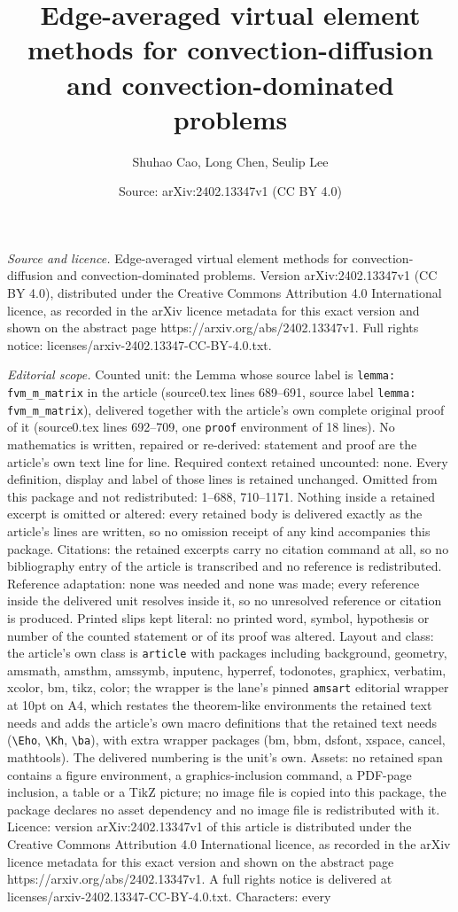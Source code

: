 \documentclass[10pt,a4paper]{amsart}
\title[Edge-averaged virtual element methods for convection-diffusi]{Edge-averaged virtual element methods for convection-diffusion and convection-dominated problems}
\author{Shuhao Cao, Long Chen, Seulip Lee}
\date{Source: arXiv:2402.13347v1 (CC BY 4.0)}
\begin{document}
\maketitle

\noindent\emph{Source and licence.} Edge-averaged virtual element methods for convection-diffusion and convection-dominated problems. Version arXiv:2402.13347v1 (CC BY 4.0), distributed under the Creative Commons Attribution 4.0 International licence, as recorded in the arXiv licence metadata for this exact version and shown on the abstract page https://arxiv.org/abs/2402.13347v1. Full rights notice: licenses/arxiv-2402.13347-CC-BY-4.0.txt.\par\smallskip

\noindent\textit{Editorial scope.} Counted unit: the Lemma whose source label is \texttt{lemma: fvm\_m\_matrix} in the article (source0.tex lines 689--691, source label \texttt{lemma: fvm\_m\_matrix}), delivered together with the article's own complete original proof of it (source0.tex lines 692--709, one \texttt{proof} environment of 18 lines). No mathematics is written, repaired or re-derived: statement and proof are the article's own text line for line. Required context retained uncounted: none. Every definition, display and label of those lines is retained unchanged. Omitted from this package and not redistributed: 1--688, 710--1171. Nothing inside a retained excerpt is omitted or altered: every retained body is delivered exactly as the article's lines are written, so no omission receipt of any kind accompanies this package. Citations: the retained excerpts carry no citation command at all, so no bibliography entry of the article is transcribed and no reference is redistributed. Reference adaptation: none was needed and none was made; every reference inside the delivered unit resolves inside it, so no unresolved reference or citation is produced. Printed slips kept literal: no printed word, symbol, hypothesis or number of the counted statement or of its proof was altered. Layout and class: the article's own class is \texttt{article} with packages including background, geometry, amsmath, amsthm, amssymb, inputenc, hyperref, todonotes, graphicx, verbatim, xcolor, bm, tikz, color; the wrapper is the lane's pinned \texttt{amsart} editorial wrapper at 10pt on A4, which restates the theorem-like environments the retained text needs and adds the article's own macro definitions that the retained text needs (\texttt{\textbackslash Eho}, \texttt{\textbackslash Kh}, \texttt{\textbackslash ba}), with extra wrapper packages (bm, bbm, dsfont, xspace, cancel, mathtools). The delivered numbering is the unit's own. Assets: no retained span contains a figure environment, a graphics-inclusion command, a PDF-page inclusion, a table or a TikZ picture; no image file is copied into this package, the package declares no asset dependency and no image file is redistributed with it. Licence: version arXiv:2402.13347v1 of this article is distributed under the Creative Commons Attribution 4.0 International licence, as recorded in the arXiv licence metadata for this exact version and shown on the abstract page https://arxiv.org/abs/2402.13347v1. A full rights notice is delivered at licenses/arxiv-2402.13347-CC-BY-4.0.txt. Characters: every 
\end{document}

